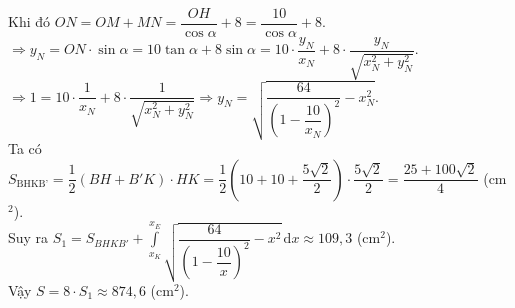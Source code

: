 \begin{ex}
{	  Khi đó
	 $ON=OM+MN=\dfrac{OH}{\cos \alpha}+8=\dfrac{10}{\cos \alpha}+8$.\\
	 $\Rightarrow y_N=ON\cdot \sin \alpha=10 \tan \alpha+8\sin \alpha=10 \cdot \dfrac{y_N}{x_N}+8\cdot \dfrac{y_N}{\sqrt{x_N^2+y_N^2}}$.\\
	 $\Rightarrow 1=10 \cdot \dfrac{1}{x_N}+8\cdot \dfrac{1}{\sqrt{x_N^2+y_N^2}} \Rightarrow y_N=\sqrt{\dfrac{64}{\left(1-\dfrac{10}{x_N}\right)^2}-x_N^2}$.\\
	 Ta có 
	 $S_{\text {BHKB'}}=\dfrac{1}{2}(BH+B'K) \cdot HK=\dfrac{1}{2}\left(10+10+\dfrac{5\sqrt{2}}{2}\right) \cdot \dfrac{5\sqrt{2}}{2}=\dfrac{25+100\sqrt{2}}{4} $ (cm$^2$).\\
	 Suy ra $S_1=S_{BHKB'}+\displaystyle\int\limits_{x_K}^{x_E} \sqrt{\dfrac{64}{\left(1-\dfrac{10}{x}\right)^2}-x^2}\mathrm{\,d}x \approx 109{,}3$ (cm$^2$).\\
	 Vậy $S=8\cdot S_1 \approx 874{,}6$ (cm$^2$).
}
\end{ex}

